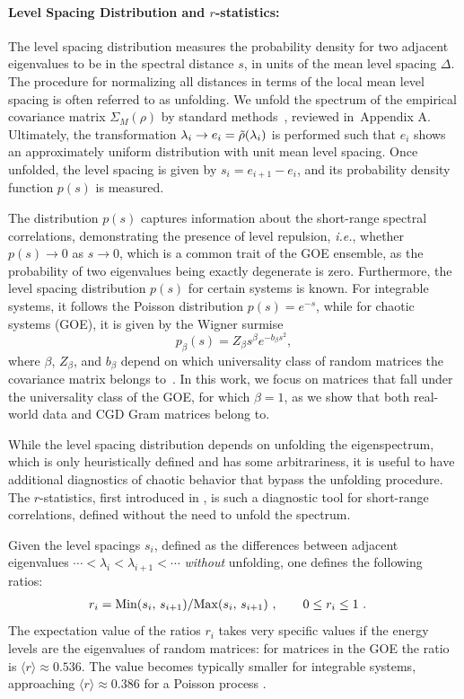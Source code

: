 \documentclass{article}
\begin{document}
\paragraph{Level Spacing Distribution and $r$-statistics:}
The level spacing distribution measures the probability density for two adjacent eigenvalues to be in the spectral distance $s$, in units of the mean level spacing $\Delta$.
The procedure for normalizing all distances in terms of the local mean level spacing is often referred to as unfolding.
We unfold the spectrum of the empirical covariance matrix $\Sigma_M(\rho)$ by standard methods~\citep{Kim_2023}, reviewed in~Appendix A.
Ultimately, the transformation $\lambda_i \to e_i = \Tilde{\rho}(\lambda_i) $ is performed such that $e_i$ shows an approximately uniform distribution with unit mean level spacing.
Once unfolded, the level spacing is given by $s_{i} = e_{i+1}-e_i$, and its probability density function $p(s)$ is measured. 

The distribution $p(s)$ captures information about the short-range spectral correlations, demonstrating the presence of level repulsion, \textit{i.e.}, whether $p(s)\rightarrow 0$ as $s\rightarrow 0$, which is a common trait of the GOE ensemble, as the probability of two eigenvalues being exactly degenerate is zero.
Furthermore, the level spacing distribution $p(s)$ for certain systems is known. For integrable systems, it follows the Poisson distribution $p(s) = e^{-s}$, while for chaotic systems (GOE), it is given by the Wigner surmise
\begin{equation}
p_{\beta}(s) = Z_\beta{s^{\beta} e^{-b_{\beta}s^2}},
\label{Wigner}
\end{equation}
where $\beta$, $Z_\beta$, and $b_\beta$ depend on which universality class of random matrices the covariance matrix belongs to~\citep{mehta_book}. In this work, we focus on matrices that fall under the universality class of the GOE, for which $\beta=1$, as we show that both real-world data and CGD Gram matrices belong to.


While the level spacing distribution depends on unfolding the eigenspectrum, which is only heuristically defined and has some arbitrariness, it is useful to have additional diagnostics of chaotic behavior that bypass the unfolding procedure. The $r$-statistics, first introduced in \citet{huse_r_stat}, is such a diagnostic tool for short-range correlations, defined without the need to unfold the spectrum.

Given the level spacings $s_i$, defined as the differences between adjacent eigenvalues $\cdots < \lambda_i < \lambda_{i+1} < \cdots$ {\it without} unfolding, one defines the following ratios:
\begin{align}
\label{eq:ri_definition}
& r_i =
{{\rm Min}(s_i, \, s_{i+1})}/
{{\rm Max}(s_i, \, s_{i+1})}
\ ,  \qquad
0\leq r_i \leq 1 \ .
\end{align}
The expectation value of the ratios $r_i$ takes very specific values if the energy levels are the eigenvalues of random matrices: for matrices in the GOE the ratio is $\langle r\rangle \approx 0.536$.
The value becomes typically smaller for integrable systems, approaching $\langle r \rangle \approx 0.386$ for a Poisson process \citep{r_ratios_theory_values}.
\end{document}
